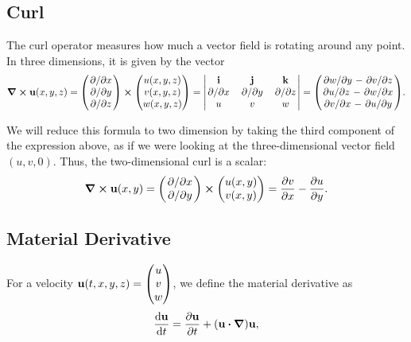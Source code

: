\subsection*{Curl}
The curl operator measures how much a vector field is rotating around any point. 
In three dimensions, it is given by the vector
$$\curl{\vb{u}(x,y,z) = 
    \mqty(\pdv*{x} \\ \pdv*{y} \\ \pdv*{z}) \cross 
    \mqty(u(x,y,z) \\ v(x,y,z) \\ w(x,y,z))
= \mqty|
    \vb{i}   & \vb{j}   & \vb{k}   \\
    \pdv*{x} & \pdv*{y} & \pdv*{z} \\
    u        & v        & w
|} = \mqty(
\pdv*{w}{y} - \pdv*{v}{z} \\
\pdv*{u}{z} - \pdv*{w}{x} \\
\pdv*{v}{x} - \pdv*{u}{y}
).$$

We will reduce this formula to two dimension by taking the third component of
the expression above, as if we were looking at the three-dimensional vector
field $(u,v,0)$. Thus, the two-dimensional curl is a scalar:
$$\curl{\vb{u}(x,y)} = 
    \mqty(\pdv*{x} \\ \pdv*{y}) \cross 
    \mqty(u(x,y) \\ v(x,y))
    = \pdv{v}{x} - \pdv{u}{y}.$$

\subsection*{Material Derivative}
For a velocity $\vb{u}(t,x,y,z) = \mqty(u \\ v \\ w)$, 
we define the material derivative as 
$$\dv{\vb{u}}{t} = \pdv{\vb{u}}{t} + \qty(\vb{u}\vdot\grad)\vb{u} ,$$

